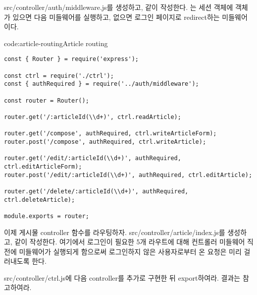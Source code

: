 src/controller/auth/middleware.js를 생성하고, \와 같이 작성한다. 는 세션 객체에  객체가 있으면 다음 미들웨어를 실행하고, 없으면 로그인 페이지로 redirect하는 미들웨어이다.

\begin{code}{code:article-routing}{Article routing}
\begin{verbatim}
const { Router } = require('express');

const ctrl = require('./ctrl');
const { authRequired } = require('../auth/middleware');

const router = Router();

router.get('/:articleId(\\d+)', ctrl.readArticle);

router.get('/compose', authRequired, ctrl.writeArticleForm);
router.post('/compose', authRequired, ctrl.writeArticle);

router.get('/edit/:articleId(\\d+)', authRequired, ctrl.editArticleForm);
router.post('/edit/:articleId(\\d+)', authRequired, ctrl.editArticle);

router.get('/delete/:articleId(\\d+)', authRequired, ctrl.deleteArticle);

module.exports = router;
\end{verbatim}
\end{code}

이제 게시물 controller 함수를 라우팅하자. src/controller/article/index.js를 생성하고, \과 같이 작성한다. 여기에서 로그인이 필요한 5개 라우트에 대해 컨트롤러 미들웨어 직전에  미들웨어가 실행되게 함으로써 로그인하지 않은 사용자로부터 온 요청은 미리 걸러내도록 한다.

src/controller/ctrl.js에 다음 controller를 추가로 구현한 뒤 export하여라. 결과는 \를 참고하여라.

